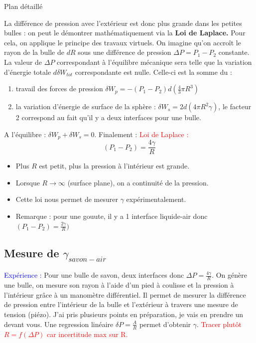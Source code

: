 \begin{reportBlock}{Plan détaillé}
\begin{center}
 \end{center}
 La différence de pression avec l'extérieur est donc plus grande dans les petites bulles : on peut le démontrer mathématiquement via la \textbf{Loi de Laplace.}
 Pour cela, on applique le principe des travaux virtuels. On imagine qu'on accroît le rayon de la bulle de $dR$ sous une différence de pression $\Delta P = P_1-P_2$ constante. La valeur de $\Delta P$ correspondant à l'équilibre mécanique sera telle que la variation d'énergie totale $d\delta W_{tot}$ correspondante est nulle. Celle-ci est la somme du :
 \begin{enumerate}
     \item travail des forces de pression $\delta W_p = -(P_1-P_2)d(\frac{4}{3}\pi R^3)$
     \item la variation d'énergie de surface de la sphère : $\delta W_s = 2d(4\pi R^2\gamma)$, le facteur 2 correspond au fait qu'il y a deux interfaces pour une bulle.
 \end{enumerate}
 A l'équilibre : $\delta W_p+\delta W_s =0$.  Finalement : 
 \textcolor{red}{Loi de Laplace : }
 \begin{equation}
     (P_1-P_2)=\frac{4\gamma}{R}
 \end{equation}
 \begin{itemize}
     \item Plus $R$ est petit, plus la pression à l'intérieur est grande. 
     \item Lorsque $R \rightarrow \infty$ (surface plane), on a continuité de la pression.
     \item Cette loi nous permet de mesurer $\gamma$ expérimentalement.
     \item Remarque : pour une gouute, il y a 1 interface liquide-air donc $(P_1-P_2)=\frac{2\gamma}{R})$
 \end{itemize}
 
 \subsection{Mesure de $\gamma_{savon-air}$}
 \textcolor{blue}{Expérience :}  Pour une bulle de savon, deux interfaces donc $\Delta P =\frac{4\gamma}{R}$. On génère une bulle, on mesure son rayon à l'aide d'un pied à coulisse et la pression à l'intérieur grâce à un manomètre différentiel. Il permet de mesurer la différence de pression entre l'intérieur de la bulle et l'extérieur à travers une mesure de tension (piézo). J'ai pris plusieurs points en préparation, je vais en prendre un devant vous. Une regression linéaire $\delta P = \frac{A}{R}$ permet d'obtenir $\gamma$. \textcolor{red}{Tracer plutôt $R=f(\Delta P)$ car incertitude max sur R.}\\


\end{reportBlock}
